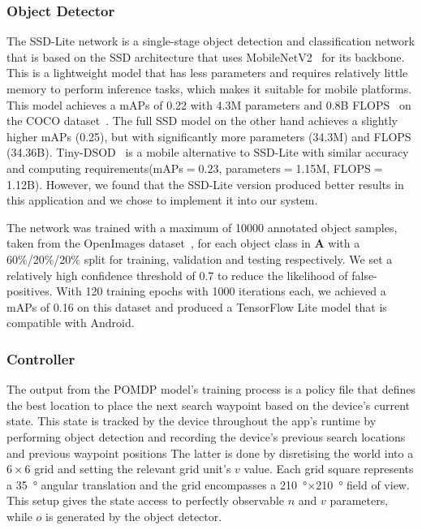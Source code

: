 \documentclass[runningheads]{llncs}
\newcommand\todo[1]{\textcolor{red}{#1}}
\begin{document}
\subsubsection{Object Detector}

The SSD-Lite network is a single-stage object detection and classification network that is based on the SSD architecture that uses MobileNetV2~\cite{sandler2018mobilenetv2} for its backbone.
This is a lightweight model that has less parameters and requires relatively little memory to perform inference tasks, which makes it suitable for mobile platforms. 
This model achieves a mAPs of 0.22 with 4.3M parameters and 0.8B FLOPS~\cite{li2018tinydsod} on the COCO dataset~\cite{lin2014microsoft}. 
The full SSD model on the other hand achieves a slightly higher mAPs (0.25), but with significantly more parameters (34.3M) and FLOPS (34.36B).
Tiny-DSOD~\cite{li2018tinydsod} is a mobile alternative to SSD-Lite with similar accuracy and computing requirements(mAPs$=0.23$, parameters$=$1.15M, FLOPS$=$1.12B).
However, we found that the SSD-Lite version produced better results in this application and we chose to implement it into our system.

The network was trained with a maximum of 10000 annotated object samples, taken from the OpenImages dataset~\cite{openimages}, for each object class in $\mathbf{A}$ with a 60\%/20\%/20\% split for training, validation and testing respectively.
We set a relatively high confidence threshold of 0.7 to reduce the likelihood of false-positives.
With 120 training epochs with 1000 iterations each, we achieved a mAPs of 0.16 on this dataset and produced a TensorFlow Lite model that is compatible with Android. 

\subsubsection{Controller}

The output from the POMDP model's training process is a policy file that defines the best location to place the next search waypoint based on the device's current state.
This state is tracked by the device throughout the app's runtime by performing object detection and recording the device's previous search locations and previous waypoint positions
The latter is done by disretising the world into a $6\times6$ grid and setting the relevant grid unit's $v$ value.
Each grid square represents a \SI{35}{\degree} angular translation and the grid encompasses a \SI{210}{\degree}$\times$\SI{210}{\degree} field of view. 
This setup gives the state access to perfectly observable $n$ and $v$ parameters, while $o$ is generated by the object detector. 
\end{document}
